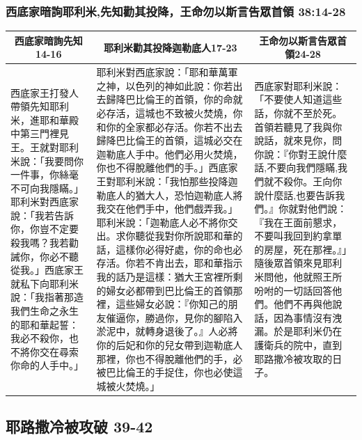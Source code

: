 \subsubsection{西底家暗詢耶利米,先知勸其投降，王命勿以斯言告眾首領 38:14-28}
\begin{table}[H]
\centering
\begin{tabular}{p{3.75cm}|p{8.250cm}|p{4.750cm}}\hline\hline
\multicolumn{1}{c|}{西底家暗詢先知14-16}&\multicolumn{1}{c|}{耶利米勸其投降迦勒底人17-23}&\multicolumn{1}{c}{王命勿以斯言告眾首領24-28}\\\hline
西底家王打發人帶領先知耶利米，進耶和華殿中第三門裡見王。王就對耶利米說：「我要問你一件事，你絲毫不可向我隱瞞。」耶利米對西底家說：「我若告訴你，你豈不定要殺我嗎？我若勸誡你，你必不聽從我。」西底家王就私下向耶利米說：「我指著那造我們生命之永生的耶和華起誓：我必不殺你，也不將你交在尋索你命的人手中。」
&耶利米對西底家說：「耶和華萬軍之神，以色列的神如此說：你若出去歸降巴比倫王的首領，你的命就必存活，這城也不致被火焚燒，你和你的全家都必存活。你若不出去歸降巴比倫王的首領，這城必交在迦勒底人手中。他們必用火焚燒，你也不得脫離他們的手。」西底家王對耶利米說：「我怕那些投降迦勒底人的猶大人，恐怕迦勒底人將我交在他們手中，他們戲弄我。」耶利米說：「迦勒底人必不將你交出。求你聽從我對你所說耶和華的話，這樣你必得好處，你的命也必存活。你若不肯出去，耶和華指示我的話乃是這樣：猶大王宮裡所剩的婦女必都帶到巴比倫王的首領那裡，這些婦女必說：『你知己的朋友催逼你，勝過你，見你的腳陷入淤泥中，就轉身退後了。』人必將你的后妃和你的兒女帶到迦勒底人那裡，你也不得脫離他們的手，必被巴比倫王的手捉住，你也必使這城被火焚燒。」
&西底家對耶利米說：「不要使人知道這些話，你就不至於死。首領若聽見了我與你說話，就來見你，問你說：『你對王說什麼話,不要向我們隱瞞,我們就不殺你。王向你說什麼話,也要告訴我們。』你就對他們說：『我在王面前懇求，不要叫我回到約拿單的房屋，死在那裡。』」隨後眾首領來見耶利米問他，他就照王所吩咐的一切話回答他們。他們不再與他說話，因為事情沒有洩漏。於是耶利米仍在護衛兵的院中，直到耶路撒冷被攻取的日子。\\\hline
\end{tabular}
\end{table}
 

\subsection{耶路撒冷被攻破 39-42}
